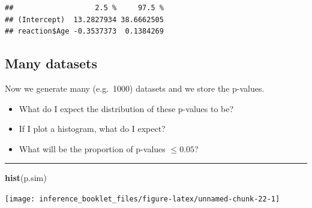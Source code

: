 \documentclass[]{article}
\newenvironment{Shaded}{\begin{snugshade}}{\end{snugshade}}
\newcommand{\CommentTok}[1]{\textcolor[rgb]{0.56,0.35,0.01}{\textit{#1}}}
\newcommand{\ControlFlowTok}[1]{\textcolor[rgb]{0.13,0.29,0.53}{\textbf{#1}}}
\newcommand{\DecValTok}[1]{\textcolor[rgb]{0.00,0.00,0.81}{#1}}
\newcommand{\KeywordTok}[1]{\textcolor[rgb]{0.13,0.29,0.53}{\textbf{#1}}}
\newcommand{\NormalTok}[1]{#1}
\newcommand{\OperatorTok}[1]{\textcolor[rgb]{0.81,0.36,0.00}{\textbf{#1}}}
\newcommand{\StringTok}[1]{\textcolor[rgb]{0.31,0.60,0.02}{#1}}
\providecommand{\tightlist}{%
  \setlength{\itemsep}{0pt}\setlength{\parskip}{0pt}}
\begin{document}
\begin{verbatim}
##                   2.5 %     97.5 %
## (Intercept)  13.2827934 38.6662505
## reaction$Age -0.3537373  0.1384269
\end{verbatim}

\hypertarget{many-datasets}{%
\subsection{Many datasets}\label{many-datasets}}

Now we generate many (e.g.~1000) datasets and we store the p-values.

\begin{Shaded}
\end{Shaded}

\begin{itemize}
\tightlist
\item
  What do I expect the distribution of these p-values to be?
\item
  If I plot a histogram, what do I expect?
\item
  What will be the proportion of p-values \(\leq 0.05\)?
\end{itemize}

\begin{center}\rule{0.5\linewidth}{\linethickness}\end{center}

\begin{Shaded}
\begin{Highlighting}[]
\KeywordTok{hist}\NormalTok{(p.sim)}
\end{Highlighting}
\end{Shaded}

\begin{center}\texttt{[image: inference\_booklet\_files/figure-latex/unnamed-chunk-22-1]} \end{center}
\end{document}
